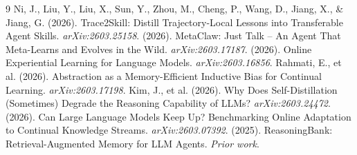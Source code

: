 \documentclass[11pt]{article}
\begin{document}
\begin{thebibliography}{9}
 Ni, J., Liu, Y., Liu, X., Sun, Y., Zhou, M., Cheng, P., Wang, D., Jiang, X., \& Jiang, G. (2026). Trace2Skill: Distill Trajectory-Local Lessons into Transferable Agent Skills. \textit{arXiv:2603.25158}.
 (2026). MetaClaw: Just Talk -- An Agent That Meta-Learns and Evolves in the Wild. \textit{arXiv:2603.17187}.
 (2026). Online Experiential Learning for Language Models. \textit{arXiv:2603.16856}.
 Rahmati, E., et al. (2026). Abstraction as a Memory-Efficient Inductive Bias for Continual Learning. \textit{arXiv:2603.17198}.
 Kim, J., et al. (2026). Why Does Self-Distillation (Sometimes) Degrade the Reasoning Capability of LLMs? \textit{arXiv:2603.24472}.
 (2026). Can Large Language Models Keep Up? Benchmarking Online Adaptation to Continual Knowledge Streams. \textit{arXiv:2603.07392}.
 (2025). ReasoningBank: Retrieval-Augmented Memory for LLM Agents. \textit{Prior work}.
\end{thebibliography}
\end{document}
